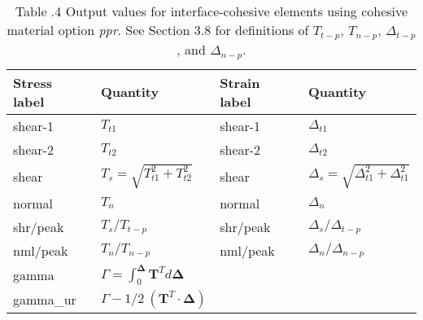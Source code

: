\documentclass[11pt]{report}
\numberwithin{equation}{section}
\newcommand{\bmf } {\boldsymbol }  %
\newcommand{\ti}{\emph}
\begin{document}
\begin{table}[htb]	
\centering
\small
{
\setlength{\extrarowheight}{4 pt}
\begin{tabular}{ | p{1.0in} | >{\centering\arraybackslash}m{1.5in} | | p{1.0in} | >{\centering\arraybackslash}m{1.5in} |  }
 \hline
  Stress label & Quantity& Strain label& Quantity \\
\hline \hline
\hspace{0.25in}shear-1 & $T_{t1}$& \hspace{0.25in}shear-1 & $\Delta_{t1}$ \\
\hspace{0.25in}shear-2 & $T_{t2}$ & \hspace{0.25in}shear-2 & $\Delta_{t2}$ \\ 
\hspace{0.25in}shear & $T_s = \sqrt{T_{t1}^2 + T_{t2}^2}$ & \hspace{0.25in}shear & $ \Delta_s = \sqrt{\Delta_{t1}^2 + \Delta_{t1}^2}$ \\ 
\hspace{0.25in}normal & $T_n$ & \hspace{0.25in}normal & $\Delta_n$ \\

\hspace{0.25in}shr/peak & $T_s / T_{t-p}$ &\hspace{0.25in}shr/peak & $\Delta_s / \Delta_{t-p}$ \\ 

\hspace{0.25in}nml/peak & $T_n / T_{n-p}$ & \hspace{0.25in}nml/peak & $\Delta_n / \Delta_{n-p}$ \\
 

\hspace{0.25in}gamma &$  \Gamma = \int_0^{\bmf{\Delta}} \bmf{T}^T d\bmf{\Delta}$ & & \\ 
\hspace{0.25in}gamma\_ur & $\Gamma - 1/2\ ( \bmf{T}^T \cdot \bmf{\Delta})$& &  \\ \hline 
\end{tabular}}
%
\begin{minipage}[c]{6in}
\caption{\\ \small Table \thesection.4
Output values for interface-cohesive elements using 
cohesive material option \ti{ppr}. See Section 3.8 for definitions of
$T_{t-p}$, $T_{n-p}$, $\Delta_{t-p}$, and  $\Delta_{n-p}$.}
\end{minipage}
\label{table:linear_model_output}
\end{table}
\normalsize
\end{document}
